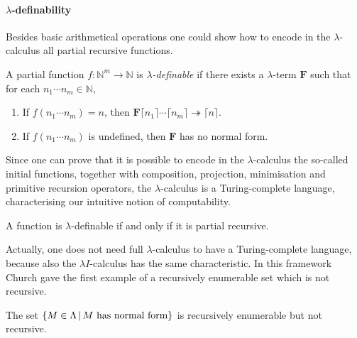 \paragraph{$\lambda$-definability}
Besides basic arithmetical operations one could show how to encode in the $\lambda$-calculus all partial recursive functions. 
\begin{definition}
	A partial function $f:\mathbb{N}^m\rightarrow\mathbb{N}$ is \emph{$\lambda$-definable} if there exists a $\lambda$-term $\mathbf{F}$ such that for each $n_1\cdots n_m\in\mathbb{N}$,
	\begin{enumerate}
		\item If $f(n_1\cdots n_m)=n$, then $\mathbf{F}\lceil n_1\rceil\cdots\lceil n_m\rceil\twoheadrightarrow \lceil n\rceil$.
		\item If $f(n_1\cdots n_m)$ is undefined, then $\mathbf{F}$  has no normal form.
	\end{enumerate}
\end{definition}
Since one can prove that it is possible to encode in the $\lambda$-calculus the so-called initial functions, together with composition, projection, minimisation and primitive recursion operators, the $\lambda$-calculus is a Turing-complete language, characterising our intuitive notion of computability.
\begin{theorem}
	A function is $\lambda$-definable if and only if it is partial recursive.
\end{theorem}
Actually, one does not need full $\lambda$-calculus to have a Turing-complete language, because also the $\lambda I$-calculus has the same characteristic. In this framework Church gave the first example of a recursively enumerable set which is not recursive.
\begin{theorem}
	The set $\{M\in\Lambda\,|\,M\textrm{ has normal form}\}$ is recursively enumerable but not recursive.
\end{theorem}
